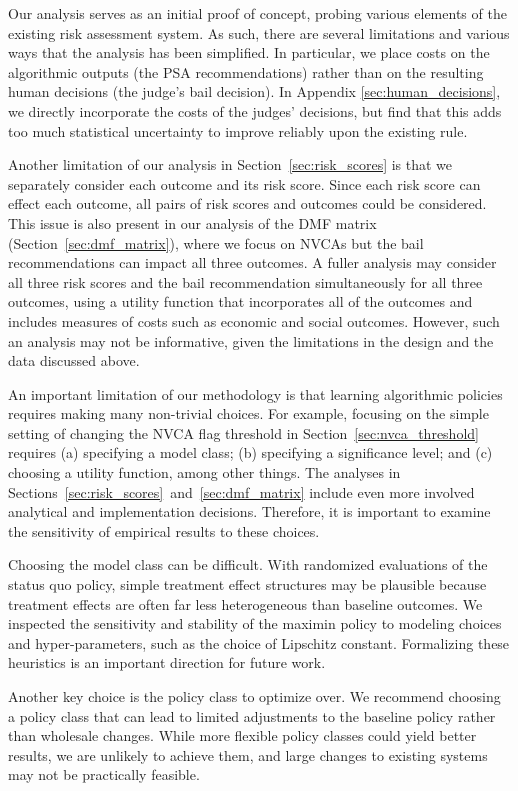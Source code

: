 \documentclass[12pt]{article}
\theoremstyle{definition}
\newcommand{\<}{\langle}
\renewcommand{\>}{\rangle}
\begin{document}
Our analysis serves as an initial proof of concept, probing
various elements of the existing risk assessment system.
As such, there are several limitations and various ways that the analysis has
been simplified. In particular, we place costs on the algorithmic outputs
(the PSA recommendations) rather than on the resulting human decisions (the
judge's bail decision). In Appendix \ref{sec:human_decisions}, we
directly incorporate the costs of the judges'
decisions, but find that this adds too much statistical
uncertainty to improve reliably upon the existing rule.

Another limitation of our analysis in
Section~\ref{sec:risk_scores} is that we separately consider
each outcome and its risk score. Since each risk score can effect each outcome,
 all pairs of risk scores and outcomes could be
considered.  This issue is also present in our analysis of the
DMF matrix (Section~\ref{sec:dmf_matrix}), where we focus
on NVCAs but the bail recommendations can impact all three
outcomes.  A fuller analysis may consider all three risk
scores and the bail recommendation simultaneously for all
three outcomes, using a utility function that incorporates all
of the outcomes and includes measures of costs such
as economic and social outcomes.  However, such an analysis
may not be informative, given the limitations
 in the design
and the data 
discussed above.

An important limitation of our methodology is that
learning algorithmic policies requires making many non-trivial
choices. For example, focusing on the simple setting of
changing the NVCA flag threshold in
Section~\ref{sec:nvca_threshold} requires (a) specifying a
model class; (b) specifying a significance level; and (c)
choosing a utility function, among other things.
The analyses in
Sections~\ref{sec:risk_scores}~and~\ref{sec:dmf_matrix}
include even more involved analytical and implementation
decisions.  Therefore, it is important to examine the
sensitivity of empirical results to these choices.

Choosing the model class can be difficult. With randomized evaluations 
of the status quo policy, simple treatment effect structures may be plausible
because treatment effects are often far less heterogeneous than
baseline outcomes.
We inspected the sensitivity and stability of the maximin policy
to modeling choices and hyper-parameters, such as the choice of
Lipschitz constant.
Formalizing these heuristics is an important direction for future work.

Another key choice is the policy class to optimize over.
We recommend choosing a policy class that can lead to
limited adjustments to the baseline policy rather than wholesale
changes.  While more flexible policy classes could yield better
results, we are unlikely to achieve them, and large changes to
existing systems may not be practically feasible.
\end{document}
